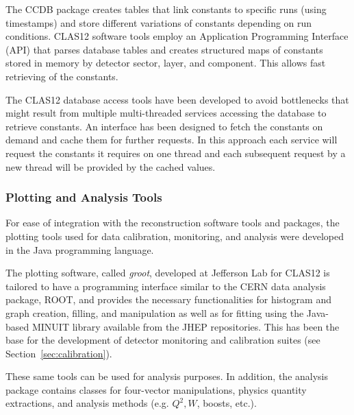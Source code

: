 The CCDB package creates tables that link constants to specific runs (using timestamps) and store different
variations of constants depending on run conditions. CLAS12 software tools employ an Application Programming
Interface (API) that parses database tables and creates structured maps of constants stored in  memory by
detector sector, layer, and component. This allows fast retrieving of the constants.

The CLAS12 database access tools have been developed to avoid bottlenecks that might result from multiple
multi-threaded services accessing the database to retrieve constants.  An interface has been designed to fetch
the constants on demand and cache them for further requests. In this approach each service will request the
constants it requires on one thread and each subsequent request by a new thread will be provided by the cached
values.

\subsubsection{Plotting and Analysis Tools}

For ease of integration with the reconstruction software tools and packages, the plotting tools used for data
calibration, monitoring, and analysis were developed in the Java programming language.

The plotting software, called {\it groot}, developed at Jefferson Lab for CLAS12 is tailored to have a programming
interface similar to the CERN data analysis package, ROOT, and provides the necessary functionalities for
histogram and graph creation, filling, and manipulation as well as for fitting using the Java-based MINUIT library
available from the JHEP repositories. This has been the base for the development of detector monitoring and
calibration suites (see Section~\ref{sec:calibration}).

These same tools can be used for analysis purposes. In addition, the analysis package contains classes for four-vector
manipulations, physics quantity extractions, and analysis methods (e.g. $Q^2, W$, boosts, etc.).

